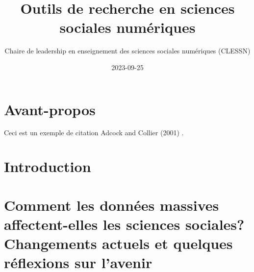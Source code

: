 \documentclass[
  letterpaper,
]{scrbook}
\title{Outils de recherche en sciences sociales numériques}
\author{Chaire de leadership en enseignement des sciences sociales
numériques (CLESSN)}
\date{2023-09-25}
\renewcommand*\contentsname{Table of contents}
\newcommand\contentsname{Table of contents}
\begin{document}
\frontmatter
\maketitle
\ifdefined\Shaded\renewenvironment{Shaded}{\begin{tcolorbox}[sharp corners, interior hidden, boxrule=0pt, frame hidden, borderline west={3pt}{0pt}{shadecolor}, breakable, enhanced]}{\end{tcolorbox}}\fi

\renewcommand*\contentsname{Table of contents}
{
\setcounter{tocdepth}{2}
\tableofcontents
}
\mainmatter
{}

\hypertarget{avant-propos}{%
\chapter*{Avant-propos}\label{avant-propos}}


Ceci est un exemple de citation Adcock and Collier (2001) .


\hypertarget{introduction}{%
\chapter*{Introduction}\label{introduction}}



\hypertarget{comment-les-donnuxe9es-massives-affectent-elles-les-sciences-sociales-changements-actuels-et-quelques-ruxe9flexions-sur-lavenir}{%
\chapter{Comment les données massives affectent-elles les sciences
sociales? Changements actuels et quelques réflexions sur
l'avenir}\label{comment-les-donnuxe9es-massives-affectent-elles-les-sciences-sociales-changements-actuels-et-quelques-ruxe9flexions-sur-lavenir}}
\end{document}
